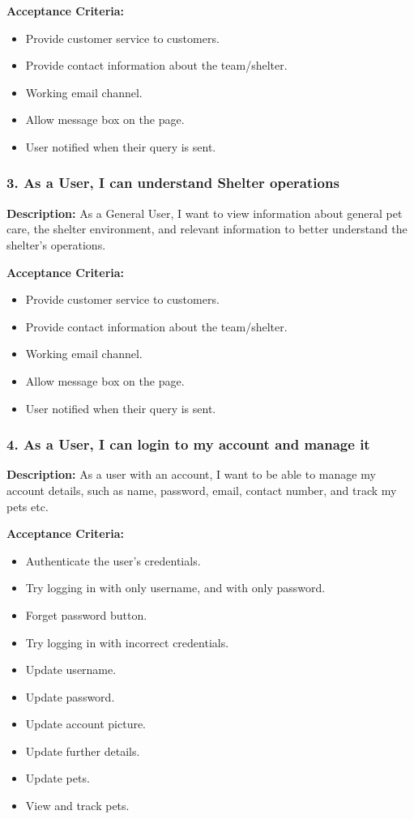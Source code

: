     \textbf{Acceptance Criteria:}
    \begin{itemize}
        \item Provide customer service to customers.
        \item Provide contact information about the team/shelter.
        \item Working email channel.
        \item Allow message box on the page.
        \item User notified when their query is sent.
    \end{itemize}
    
\subsubsection*{3. As a User, I can understand Shelter operations} 
    \textbf{Description:} As a General User, I want to view information about general pet care, the shelter environment, and relevant information to better understand the shelter’s operations. 

    \textbf{Acceptance Criteria:}
    \begin{itemize}
       \item Provide customer service to customers.
       \item Provide contact information about the team/shelter.
       \item Working email channel.
       \item Allow message box on the page.
       \item User notified when their query is sent.
    \end{itemize}
    
\subsubsection*{4. As a User, I can login to my account and manage it} 
    \textbf{Description:} As a user with an account, I want to be able to manage my account details, such as name, password, email, contact number, and track my pets etc. 
    
    \textbf{Acceptance Criteria:}
    \begin{itemize}
        \item Authenticate the user's credentials.
        \item Try logging in with only username, and with only password.
        \item Forget password button.
        \item Try logging in with incorrect credentials.
        \item Update username.
        \item Update password.
        \item Update account picture.
        \item Update further details.
        \item Update pets.
        \item View and track pets.
    \end{itemize}
    

